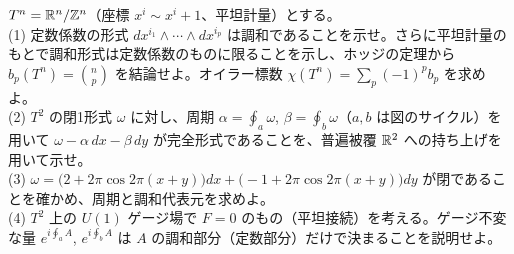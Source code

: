 \begin{problem}[難易度 B]\label{ch05-prob-torus}
$T^n=\mathbb{R}^n/\mathbb{Z}^n$（座標 $x^i\sim x^i+1$、平坦計量）とする。\\
(1) 定数係数の形式 $dx^{i_1}\wedge\cdots\wedge dx^{i_p}$ は調和であることを示せ。さらに平坦計量のもとで調和形式は定数係数のものに限ることを示し、ホッジの定理から $b_p(T^n)=\binom np$ を結論せよ。オイラー標数 $\chi(T^n)=\sum_p(-1)^pb_p$ を求めよ。\\
(2) $T^2$ の閉1形式 $\omega$ に対し、周期 $\alpha=\oint_a\omega$, $\beta=\oint_b\omega$（$a,b$ は図のサイクル）を用いて $\omega-\alpha\,dx-\beta\,dy$ が完全形式であることを、普遍被覆 $\mathbb{R}^2$ への持ち上げを用いて示せ。\\
(3) $\omega=\bigl(2+2\pi\cos2\pi(x+y)\bigr)dx+\bigl(-1+2\pi\cos2\pi(x+y)\bigr)dy$ が閉であることを確かめ、周期と調和代表元を求めよ。\\
(4) $T^2$ 上の $U(1)$ ゲージ場で $F=0$ のもの（平坦接続）を考える。ゲージ不変な量 $e^{i\oint_aA}$, $e^{i\oint_bA}$ は $A$ の調和部分（定数部分）だけで決まることを説明せよ。
\end{problem}

